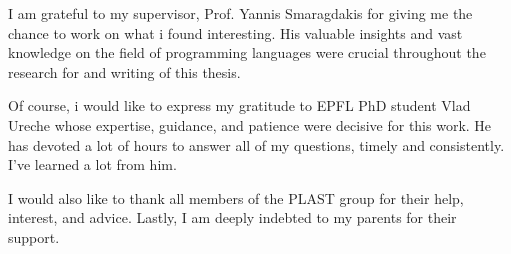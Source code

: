 I am grateful to my supervisor, Prof. Yannis Smaragdakis for giving me the chance to work on what i found interesting. His valuable insights and vast knowledge on the field of programming languages were crucial throughout the research for and writing of this thesis.

Of course, i would like to express my gratitude to EPFL PhD student Vlad Ureche whose expertise, guidance, and patience were decisive for this work. He has devoted a lot of hours to answer all of my questions, timely and consistently. I've learned a lot from him.

I would also like to thank all members of the PLAST group for their help, interest, and advice. Lastly, I
am deeply indebted to my parents for their support.



